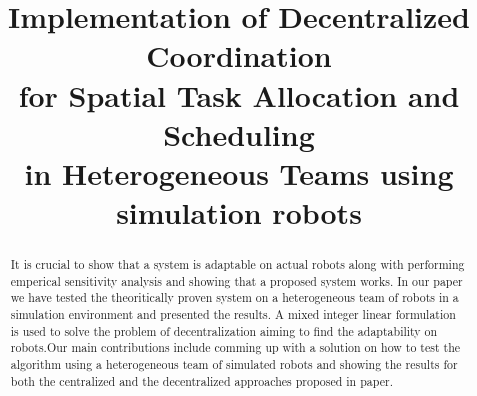\documentclass[conference]{IEEEtran}
\begin{document}
%
\title{Implementation of Decentralized Coordination\\ for Spatial Task Allocation
and Scheduling\\ in Heterogeneous Teams using simulation robots}


\author{
\and 
{}
}


% 
\maketitle

\begin{abstract}
It is crucial to show that a system is adaptable on actual robots along with performing emperical sensitivity analysis and showing that a proposed system works. In our paper we have tested the theoritically proven system on a heterogeneous team of robots in a simulation environment and presented the results. A mixed integer linear formulation\cite{feo2016decentralized} is used to solve the problem of decentralization aiming to find the adaptability on robots.Our main contributions include comming up with a solution on how to test the algorithm using a heterogeneous team of simulated robots and showing the results for both the centralized and the decentralized approaches proposed in paper\cite{feo2016decentralized}.  
\end{abstract}
\end{document}
